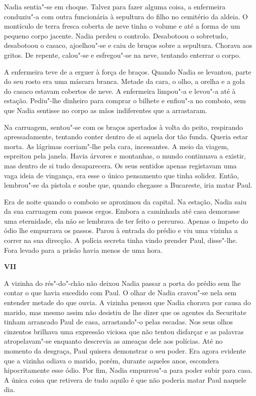 Nadia sentia"-se em choque. Talvez para
fazer alguma coisa, a enfermeira conduziu"-a com outra funcionária à
sepultura do filho no cemitério da aldeia. O montículo de terra fresca
coberta de neve tinha o volume e até a forma de um pequeno corpo
jacente. Nadia perdeu o controlo. Desabotoou o sobretudo, desabotoou o
casaco, ajoelhou"-se e caiu de bruços sobre a sepultura. Chorava aos
gritos. De repente, calou"-se e esfregou"-se na neve, tentando enterrar o
corpo.

A enfermeira teve de a erguer à força de braços. Quando Nadia se
levantou, parte do seu rosto era uma máscara branca. Metade da cara, o
olho, a orelha e a gola do casaco estavam cobertos de neve. A enfermeira
limpou"-a e levou"-a até à estação. Pediu"-lhe dinheiro para comprar o
bilhete e enfiou"-a no comboio, sem que Nadia sentisse no corpo as mãos
indiferentes que a arrastaram.

Na carruagem, sentou"-se com os braços apertados à volta do peito,
respirando apressadamente, tentando conter dentro de si aquela dor tão
funda. Queria estar morta. As lágrimas corriam"-lhe pela cara,
incessantes. A meio da viagem, espreitou pela janela. Havia árvores e
montanhas, o mundo continuava a existir, mas dentro de si tudo desaparecera. Os seus sentidos apenas registavam uma vaga ideia de vingança,
era esse o único pensamento que tinha solidez. Então, lembrou"-se da
pistola e soube que, quando chegasse a Bucareste, iria matar Paul.

Era de noite quando o comboio se aproximou da capital. Na estação, Nadia
saiu da sua carruagem com passos cegos. Embora a caminhada até casa
demorasse uma eternidade, ela não se lembrava de ter feito o percurso.
Apenas o ímpeto do ódio lhe empurrava os passos. Parou à entrada do
prédio e viu uma vizinha a correr na sua direcção. A polícia secreta
tinha vindo prender Paul, disse"-lhe. Fora levado para a prisão havia
menos de uma hora.

\pagebreak
\thispagestyle{empty}
\movetooddpage
\vspace*{1.8cm}
\noindent{}\textbf{VII}

\bigskip

A vizinha do rés"-do"-chão não deixou Nadia passar a porta do prédio sem
lhe contar o que havia sucedido com Paul. O olhar de Nadia cravou"-se
nela sem entender metade do que ouvia. A vizinha pensou que Nadia
chorava por causa do marido, mas mesmo assim não desistiu de lhe dizer
que os agentes da Securitate tinham arrancado Paul de casa, arrastando"-o
pelas escadas. Nos seus olhos cinzentos brilhava uma expressão viciosa
que não tentou disfarçar e as palavras atropelavam"-se enquanto
descrevia as ameaças dele aos polícias. Até no momento da desgraça, Paul
quisera demonstrar o seu poder. Era agora evidente que a vizinha odiava
o marido, porém, durante aqueles anos, escondera hipocritamente esse
ódio. Por fim, Nadia empurrou"-a para poder subir para casa. A única
coisa que retivera de tudo aquilo é que não poderia matar Paul naquele
dia.


